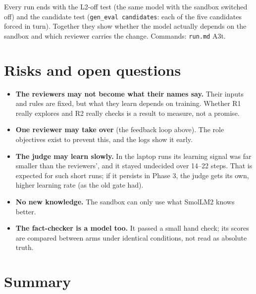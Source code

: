\documentclass[a4paper,12pt,parskip=half,headsepline]{scrartcl}
\newcommand{\code}[1]{\texttt{\small #1}}
\begin{document}
Every run ends with the L2-off test (the same model with the sandbox switched off)
and the candidate test (\code{gen\_eval candidates}: each of the five candidates
forced in turn). Together they show whether the model actually depends on the
sandbox and which reviewer carries the change. Commands: \code{run.md} A3t.

\section{Risks and open questions}

\begin{plain}
\begin{itemize}
\item \textbf{The reviewers may not become what their names say.} Their inputs and
rules are fixed, but what they learn depends on training. Whether R1 really explores
and R2 really checks is a result to measure, not a promise.
\item \textbf{One reviewer may take over} (the feedback loop above). The role
objectives exist to prevent this, and the logs show it early.
\item \textbf{The judge may learn slowly.} In the laptop runs its learning signal was
far smaller than the reviewers', and it stayed undecided over 14--22 steps. That is
expected for such short runs; if it persists in Phase 3, the judge gets its own,
higher learning rate (as the old gate had).
\item \textbf{No new knowledge.} The sandbox can only use what SmolLM2 knows better.
\item \textbf{The fact-checker is a model too.} It passed a small hand check; its
scores are compared between arms under identical conditions, not read as absolute truth.
\end{itemize}
\end{plain}

\section{Summary}
\end{document}
